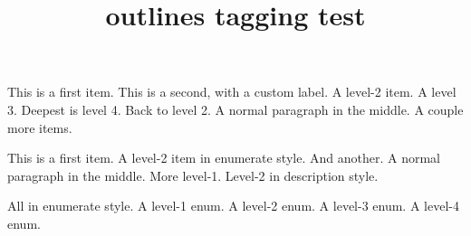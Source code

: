 \documentclass{article}
\title{outlines tagging test}
\begin{document}
\begin{outline}
\1 This is a first item.
\1[!!!] This is a second, with a custom label.
\2 A level-2 item.
\3 A level 3.
\4 Deepest is level 4.
\2 Back to level 2.
\0 A normal paragraph in the middle.
\1 A couple more
\2 items.
\end{outline}

\renewcommand{\outlineii}{enumerate}
\begin{outline}
\1 This is a first item.
\2 A level-2 item in enumerate style.
\2 And another.
\0 A normal paragraph in the middle.
\renewcommand{\outlineii}{description}
\1 More level-1.
\2[Descr] Level-2 in description style.
\end{outline}

\begin{outline}[enumerate]
\0 All in enumerate style.
\1 A level-1 enum.
\2 A level-2 enum.
\3 A level-3 enum.
\4 A level-4 enum.
\end{outline}
\end{document}
